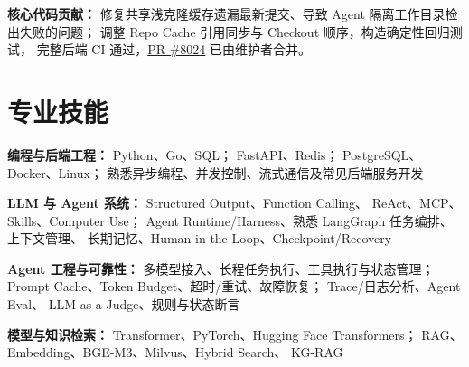 \documentclass[a4paper,8pt]{article}
\newcommand{\skill}[2]{%
    \textbf{#1：}#2\par\vspace{1.5pt}
}
\begin{document}
\vspace{1pt}

\textbf{核心代码贡献：}
修复共享浅克隆缓存遗漏最新提交、导致 Agent 隔离工作目录检出失败的问题；
调整 Repo Cache 引用同步与 Checkout 顺序，构造确定性回归测试，
完整后端 CI 通过，\href{https://github.com/multica-ai/multica/pull/8024}{PR \#8024} 已由维护者合并。


\section{专业技能}

\small

\skill{编程与后端工程}{
    Python、Go、SQL；
    FastAPI、Redis；
    PostgreSQL、Docker、Linux；
    熟悉异步编程、并发控制、流式通信及常见后端服务开发
}

\skill{LLM 与 Agent 系统}{
    Structured Output、Function Calling、
    ReAct、MCP、Skills、Computer Use；
    Agent Runtime/Harness、熟悉 LangGraph 任务编排、上下文管理、
    长期记忆、Human-in-the-Loop、Checkpoint/Recovery
}

\skill{Agent 工程与可靠性}{
    多模型接入、长程任务执行、工具执行与状态管理；
    Prompt Cache、Token Budget、超时/重试、故障恢复；
    Trace/日志分析、Agent Eval、
    LLM-as-a-Judge、规则与状态断言
}

\skill{模型与知识检索}{
    Transformer、PyTorch、Hugging Face Transformers；
    RAG、Embedding、BGE-M3、Milvus、Hybrid Search、
    KG-RAG
}
\end{document}
